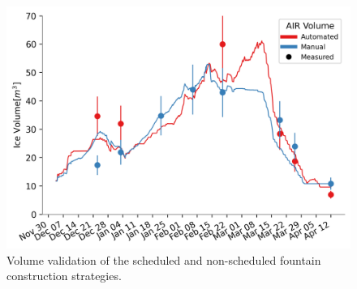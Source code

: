 \documentclass[tc, manuscript]{copernicus}
\begin{document}
\begin{figure}[htb] \includegraphics[width=12cm] {Figures/validation.png} 
  \caption{Volume validation of the scheduled and non-scheduled fountain construction strategies.} 
  \label{fig:validation} \end{figure}
\end{document}

